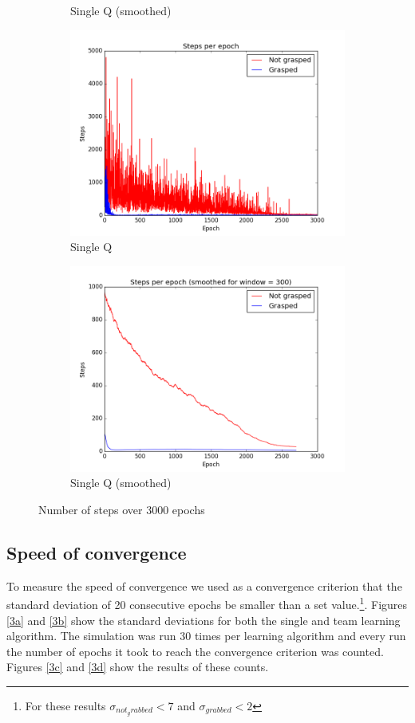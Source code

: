 \begin{figure}
\begin{subfigure}{0.48\textwidth}
		\caption{Single Q (smoothed)}
	\end{subfigure}
	\begin{subfigure}{.48\textwidth}
		\includegraphics[width=\textwidth]{images/TeamQ.png}
		\caption{Single Q}
	\end{subfigure}
	\begin{subfigure}{0.48\textwidth}
		\includegraphics[width=\textwidth]{images/TeamQ_smoothed.png}
		\caption{Single Q (smoothed)}
	\end{subfigure}
	\caption{Number of steps over 3000 epochs}
	\label{fig:Results1}
\end{figure}


\subsection{Speed of convergence}
To measure the speed of convergence we used as a convergence criterion that the standard deviation of 20 consecutive epochs be smaller than a set value.\footnote{For these results $\sigma_{not_grabbed} < 7$ and $\sigma_{grabbed} < 2$}. Figures \ref{3a} and \ref{3b} show the standard deviations for both the single and team learning algorithm. The simulation was run 30 times per learning algorithm and every run the number of epochs it took to reach the convergence criterion was counted. Figures \ref{3c} and \ref{3d} show the results of these counts.

